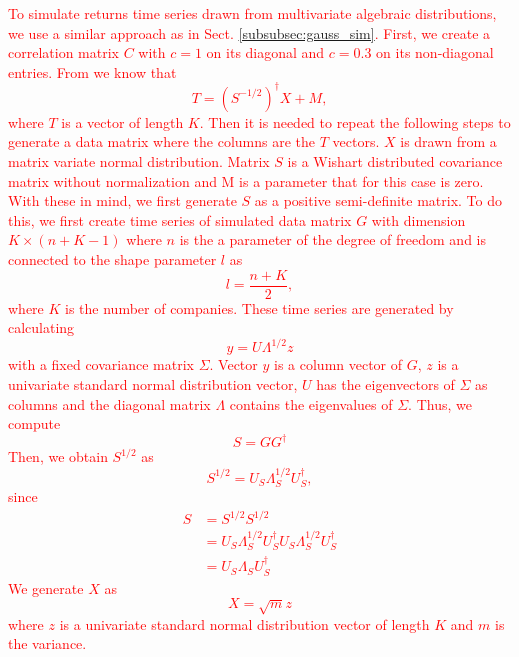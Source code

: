 \textcolor{red}{
To simulate returns time series drawn from multivariate algebraic
distributions, we use a similar approach as in Sect. \ref{subsubsec:gauss_sim}.
First, we create a correlation matrix $C$ with $c = 1$ on its diagonal and
$c = 0.3$ on its non-diagonal entries. From \cite{t_student_dist} we know that
\begin{equation}
    T = \left( S^{-1/2} \right)^{\dagger} X + M,
\end{equation}
where $T$ is a vector of length $K$. Then it is needed to repeat the following
steps to generate a data matrix where the columns are the $T$ vectors. $X$ is
drawn from a matrix variate normal distribution. Matrix $S$ is a Wishart
distributed covariance matrix without normalization and M is a parameter that
for this case is zero. With these in mind, we first generate $S$ as a
positive semi-definite matrix. To do this, we first create time series of
simulated data matrix $G$ with dimension $K \times \left(n + K - 1 \right)$
where $n$ is the a parameter of the degree of freedom and is connected to the
shape parameter $l$ as
\begin{equation}
    l = \frac{n + K}{2},
\end{equation}
where $K$ is the number of companies. These time series are generated by
calculating
\begin{equation}
    y = U \Lambda^{1/2} z
\end{equation}
with a fixed covariance matrix $\Sigma$. Vector $y$ is a column vector of $G$,
$z$ is a univariate standard normal distribution vector, $U$ has the
eigenvectors of $\Sigma$ as columns and the diagonal matrix $\Lambda$ contains
the eigenvalues of $\Sigma$. Thus, we compute
\begin{equation}
    S = G G^{\dagger}
\end{equation}
Then, we obtain $S^{1/2}$ as
\begin{equation}
    S^{1/2} = U_{S} \Lambda_{S}^{1/2} U_{S}^{\dagger},
\end{equation}
since
\begin{align}
    S &= S^{1/2} S^{1/2} \\
    &= U_{S} \Lambda_{S}^{1/2} U_{S}^{\dagger}
    U_{S} \Lambda_{S}^{1/2} U_{S}^{\dagger}\\
    &= U_{S} \Lambda_{S} U_{S}^{\dagger}
\end{align}
We generate $X$ as
\begin{equation}
    X = \sqrt{m} z
\end{equation}
where $z$ is a univariate standard normal distribution vector of length $K$ and
$m$ is the variance.}

